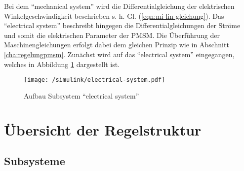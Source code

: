 Bei dem \enquote{mechanical system} wird die Differentialgleichung der elektrischen Winkelgeschwindigkeit beschrieben s. h. Gl. (\ref{eqn:mi-lin-gleichung}).
Das \enquote{electrical system} beschreibt hingegen die Differentialgleichungen der Ströme und somit die elektrischen Parameter der PMSM.
Die Überführung der Maschinengleichungen erfolgt dabei dem gleichen Prinzip wie in Abschnitt \ref{cha:regelungpmsm}.
Zunächst wird auf das \enquote{electrical system} eingegangen, welches in Abbildung \ref{fig:electrical-system} dargestellt ist.

\begin{figure}[h]
	\centering
	\texttt{[image: /simulink/electrical-system.pdf]}
	\label{fig:electrical-system}
	\caption{Aufbau Subsystem \enquote{electrical system}}
\end{figure}






\section{Übersicht der Regelstruktur}\label{sec:ueberregelung}

\subsection{Subsysteme}





